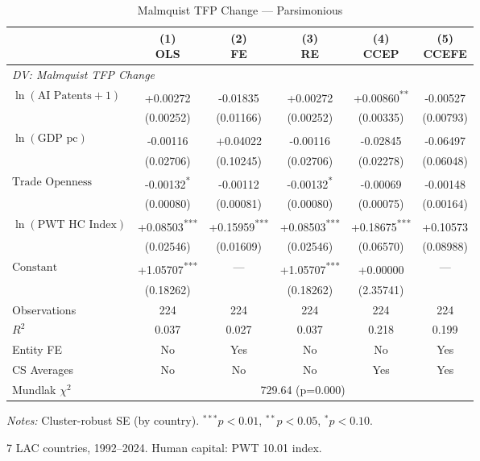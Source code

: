 \begin{table}[htbp]
\centering
\small
\caption{Malmquist TFP Change --- Parsimonious}
\label{tab:tab_malmquist_pars}
\begin{tabular}{lccccc}
\toprule
 & \makecell{(1)\\OLS} & \makecell{(2)\\FE} & \makecell{(3)\\RE} & \makecell{(4)\\CCEP} & \makecell{(5)\\CCEFE} \\
\midrule
\multicolumn{6}{l}{\textit{DV: Malmquist TFP Change}} \\[4pt]
$\ln(\text{AI Patents}+1)$ & +0.00272\textsuperscript{} & -0.01835\textsuperscript{} & +0.00272\textsuperscript{} & +0.00860\textsuperscript{**} & -0.00527\textsuperscript{} \\
 & (0.00252) & (0.01166) & (0.00252) & (0.00335) & (0.00793) \\[2pt]
$\ln(\text{GDP pc})$ & -0.00116\textsuperscript{} & +0.04022\textsuperscript{} & -0.00116\textsuperscript{} & -0.02845\textsuperscript{} & -0.06497\textsuperscript{} \\
 & (0.02706) & (0.10245) & (0.02706) & (0.02278) & (0.06048) \\[2pt]
$\text{Trade Openness}$ & -0.00132\textsuperscript{*} & -0.00112\textsuperscript{} & -0.00132\textsuperscript{*} & -0.00069\textsuperscript{} & -0.00148\textsuperscript{} \\
 & (0.00080) & (0.00081) & (0.00080) & (0.00075) & (0.00164) \\[2pt]
$\ln(\text{PWT HC Index})$ & +0.08503\textsuperscript{***} & +0.15959\textsuperscript{***} & +0.08503\textsuperscript{***} & +0.18675\textsuperscript{***} & +0.10573\textsuperscript{} \\
 & (0.02546) & (0.01609) & (0.02546) & (0.06570) & (0.08988) \\[2pt]
$\text{Constant}$ & +1.05707\textsuperscript{***} & --- & +1.05707\textsuperscript{***} & +0.00000\textsuperscript{} & --- \\
 & (0.18262) &  & (0.18262) & (2.35741) &  \\[2pt]
\midrule
Observations & 224 & 224 & 224 & 224 & 224 \\
$R^2$ & 0.037 & 0.027 & 0.037 & 0.218 & 0.199 \\
Entity FE & No & Yes & No & No & Yes \\
CS Averages & No & No & No & Yes & Yes \\
\midrule
Mundlak $\chi^2$ & \multicolumn{5}{c}{729.64 (p=0.000)} \\
\bottomrule
\end{tabular}
\begin{tablenotes}
\footnotesize
\item \textit{Notes:} Cluster-robust SE (by country). $^{***}p<0.01$, $^{**}p<0.05$, $^{*}p<0.10$.
\item 7 LAC countries, 1992--2024. Human capital: PWT 10.01 index.
\end{tablenotes}
\end{table}